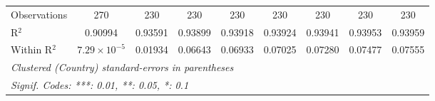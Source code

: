 \begin{table}[htbp]
\begin{tabular}{lcccccccc}
      Observations                                                    & 270                   & 230      & 230             & 230             & 230             & 230             & 230             & 230\\  
      R$^2$                                                           & 0.90994               & 0.93591  & 0.93899         & 0.93918         & 0.93924         & 0.93941         & 0.93953         & 0.93959\\  
      Within R$^2$                                                    & $7.29\times 10^{-5}$  & 0.01934  & 0.06643         & 0.06933         & 0.07025         & 0.07280         & 0.07477         & 0.07555\\  
      \midrule \midrule
      \multicolumn{9}{l}{\emph{Clustered (Country) standard-errors in parentheses}}\\
      \multicolumn{9}{l}{\emph{Signif. Codes: ***: 0.01, **: 0.05, *: 0.1}}\\
   \end{tabular}
\end{table}


